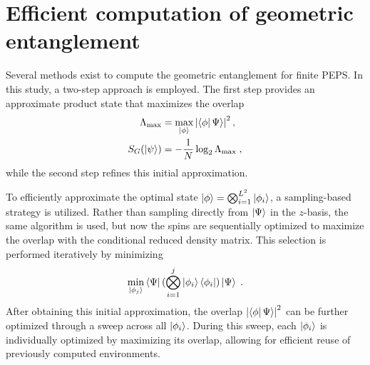 \documentclass[aps,notitlepage,twocolumn,nofootinbib,superscriptaddress,pra,10pt]{revtex4-2}
\begin{document}
\section{Efficient computation of geometric entanglement}
Several methods exist to compute the geometric entanglement for finite PEPS. In this study, a two-step approach is employed. The first step provides an approximate product state that maximizes the overlap
\begin{align}
\Lambda_{\max} &= \max_{\ket{\phi}} \left| \bra{\phi} \Psi \rangle \right|^2, \nonumber\\
S_G (\ket{\psi}) &= -\frac{1}{N}\log_2 \Lambda_{\max}\;,
\end{align}
while the second step refines this initial approximation.

To efficiently approximate the optimal state $\ket{\phi} = \bigotimes_{i=1}^{L^2} \ket{\phi_i}$, a sampling-based strategy is utilized. Rather than sampling directly from $\ket{\Psi}$ in the $z$-basis, the same algorithm is used, but now the spins are sequentially optimized to maximize the overlap with the conditional reduced density matrix. This selection is performed iteratively by minimizing
\begin{align}
\min_{\ket{\phi_j}}\bra{\Psi} (\bigotimes_{i=1}^{j}\ket{\phi_i}\bra{\phi_i})\ket{\Psi}\;.
\end{align}
After obtaining this initial approximation, the overlap $\left| \bra{\phi} \Psi \rangle \right|^2$ can be further optimized through a sweep across all $\ket{\phi_i}$. During this sweep, each $\ket{\phi_i}$ is individually optimized by maximizing its overlap, allowing for efficient reuse of previously computed environments.

\label{app:geom_ent}
\end{document}
